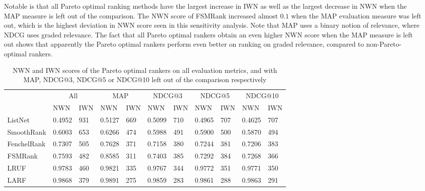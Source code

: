 \documentclass[english, authoryear, preprint]{elsarticle}
\begin{document}
Notable is that all Pareto optimal ranking methods have the largest increase in IWN as well as the largest decrease in NWN when the MAP measure is left out of the comparison. The NWN score of FSMRank increased almost $0.1$ when the MAP evaluation measure was left out, which is the highest deviation in NWN score seen in this sensitivity analysis. Note that MAP uses a binary notion of relevance, where NDCG uses graded relevance. The fact that all Pareto optimal rankers obtain an even higher NWN score when the MAP measure is left out shows that apparently the Pareto optimal rankers perform even better on ranking on graded relevance, compared to non-Pareto-optimal rankers.
\begin{table}[!h]
	\begin{adjustbox}{max width=\textwidth}
\begin{tabular}{lll|ll|ll|ll|ll}
	& \multicolumn{2}{c}{All} & \multicolumn{2}{c}{MAP} & \multicolumn{2}{c}{NDCG@3} & \multicolumn{2}{c}{NDCG@5} & \multicolumn{2}{c}{NDCG@10} \\ 
	& NWN & IWN & NWN & IWN & NWN & IWN & NWN & IWN & NWN & IWN \\
	\hline
	ListNet & 0.4952 & 931 & 0.5127 & 669 & 0.5099 & 710 & 0.4965 & 707 & 0.4625 & 707 \\ 
	SmoothRank & 0.6003 & 653 & 0.6266 & 474 & 0.5988 & 491 & 0.5900 & 500 & 0.5870 & 494 \\ 
	FenchelRank & 0.7307 & 505 & 0.7628 & 371 & 0.7158 & 380 & 0.7244 & 381 & 0.7206 & 383 \\ 
	FSMRank & 0.7593 & 482 & 0.8585 & 311 & 0.7403 & 385 & 0.7292 & 384 & 0.7268 & 366 \\ 
	LRUF & 0.9783 & 460 & 0.9821 & 335 & 0.9767 & 344 & 0.9772 & 351 & 0.9771 & 350 \\ 
	LARF & 0.9868 & 379 & 0.9891 & 275 & 0.9859 & 283 & 0.9861 & 288 & 0.9863 & 291 \\ 
\end{tabular}
\end{adjustbox}
\label{tab:sensitivity_evaluation_measure}
\caption{NWN and IWN scores of the Pareto optimal rankers on all evaluation metrics, and with MAP, NDCG@3, NDCG@5 or NDCG@10 left out of the comparison respectively}
\end{table}
\end{document}

